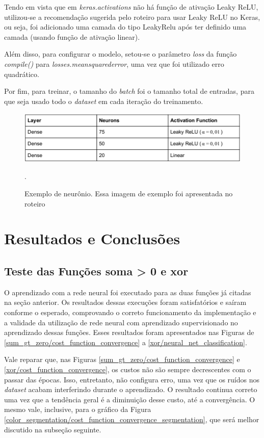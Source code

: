 \documentclass[conference]{IEEEtran}
\begin{document}
Tendo em vista que em \textit{keras.activations} não há função de ativação Leaky ReLU, utilizou-se a recomendação sugerida pelo roteiro \cite{roteiro} para usar Leaky ReLU no Keras, ou seja, foi adicionado uma camada do tipo LeakyRelu após ter definido uma camada (usando função de ativação linear).

Além disso, para configurar o modelo, setou-se o parâmetro \textit{loss} da função \textit{compile()} para \textit{losses.mean\underline{\space}squared\underline{\space}error}, uma vez que foi utilizado erro quadrático.

Por fim, para treinar, o tamanho do \textit{batch} foi o tamanho total de entradas, para que seja usado todo o \textit{dataset} em cada iteração do treinamento.

\begin{figure}[htbp]
\centering
\centerline{\includegraphics[scale=0.3]{imagens/arquitetura_rede_neural.png}}
\caption{Exemplo de neurônio. Essa imagem de exemplo foi apresentada no roteiro \cite{roteiro}}.
\label{arquitetura_rede_neural}
\end{figure}

\section{Resultados e Conclusões}

\subsection{Teste das Funções soma > 0 e xor}

O aprendizado com a rede neural foi executado para as duas funções já citadas na seção anterior. Os resultados dessas execuções foram satisfatórios e saíram conforme o esperado, comprovando o correto funcionamento da implementação e a validade da utilização de rede neural com aprendizado supervisionado no aprendizado dessas funções. Esses resultados foram apresentados nas Figuras de \ref{sum_gt_zero/cost_function_convergence} a \ref{xor/neural_net_classification}.

Vale reparar que, nas Figuras \ref{sum_gt_zero/cost_function_convergence} e \ref{xor/cost_function_convergence}, os custos não são sempre decrescentes com o passar das épocas. Isso, entretanto, não configura erro, uma vez que os ruídos nos \textit{dataset} acabam interferindo durante o aprendizado. O resultado continua correto uma vez que a tendência geral é a diminuição desse custo, até a convergência. O mesmo vale, inclusive, para o gráfico da Figura \ref{color_segmentation/cost_function_convergence_segmentation}, que será melhor discutido na subseção seguinte.
\end{document}
